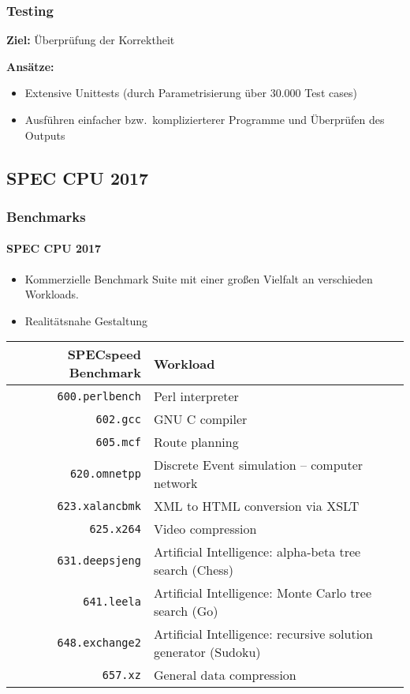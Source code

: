 \begin{frame}
	\frametitle{Testing}
	
	\textbf{Ziel:} Überprüfung der Korrektheit
	
	\vspace{0.5cm}
	
	\textbf{Ansätze:}
	\begin{itemize}
		\item Extensive Unittests (durch Parametrisierung über 30.000 Test cases)
		\item Ausführen einfacher bzw.\ komplizierterer Programme und Überprüfen des Outputs
	\end{itemize}
\end{frame}
\subsection{SPEC CPU 2017} %
\begin{frame}
	\frametitle{Benchmarks}
	\framesubtitle{SPEC CPU 2017}
	
	\begin{itemize}
		\item Kommerzielle Benchmark Suite mit einer großen Vielfalt an verschieden Workloads.
		\item Realitätsnahe Gestaltung
	\end{itemize}
	\begin{table}
		\centering
		\small
		\begin{tabular}{rl}
			\toprule
			\textbf{SPECspeed Benchmark} & \textbf{Workload}\\
			\midrule
			\texttt{600.perlbench} & Perl interpreter\\
			\texttt{602.gcc} & GNU C compiler\\
			\texttt{605.mcf} & Route planning\\
			\texttt{620.omnetpp} & Discrete Event simulation -- computer network\\
			\texttt{623.xalancbmk} & XML to HTML conversion via XSLT\\
			\texttt{625.x264} & Video compression\\
			\texttt{631.deepsjeng} & Artificial Intelligence: alpha-beta tree search (Chess)\\
			\texttt{641.leela} & Artificial Intelligence: Monte Carlo tree search (Go)\\
			\texttt{648.exchange2} & Artificial Intelligence: recursive solution generator (Sudoku)\\
			\texttt{657.xz} & General data compression\\
			\bottomrule
		\end{tabular}
	\end{table}
	
\end{frame}
